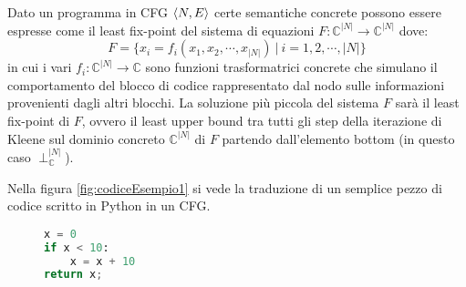 Dato un programma in CFG \(\langle N, E\rangle\) certe semantiche concrete possono essere espresse come il least fix-point del sistema di equazioni \(F:\mathbb{C}^{|N|}\rightarrow\mathbb{C}^{|N|}\) dove:
\[F = \{x_i = f_i(x_1, x_2, \cdots, x_{|N|})\ |\ i=1, 2,\cdots, |N|\}\]
in cui i vari \(f_i:\mathbb{C}^{|N|}\rightarrow\mathbb{C}\) sono funzioni trasformatrici concrete che simulano il comportamento del blocco di codice rappresentato dal nodo sulle informazioni provenienti dagli altri blocchi. La soluzione più piccola del sistema \(F\) sarà il least fix-point di \(F\), ovvero il least upper bound tra tutti gli step della iterazione di Kleene sul dominio concreto \(\mathbb{C}^{|N|}\) di \(F\) partendo dall'elemento bottom (in questo caso \(\perp_{\mathbb{C}}^{|N|}\)).

\begin{example}\label{ex:easyCode}
Nella figura \ref{fig:codiceEsempio1} si vede la traduzione di un semplice pezzo di codice scritto in Python in un CFG. 

\begin{figure}
\begin{minipage}{2cm}
\hspace{2cm}
\end{minipage}
\begin{minipage}[c][5cm][c]{0.5\textwidth-2cm}
\vspace{\fill}
\begin{lstlisting}[language=Python, numbers=none]
x = 0
if x < 10:
    x = x + 10
return x;
\end{lstlisting}
\vspace{\fill}
\end{minipage}
\begin{minipage}{0.5\textwidth}
\begin{center}
\end{center}
\end{minipage}
\end{figure}
\end{example}
